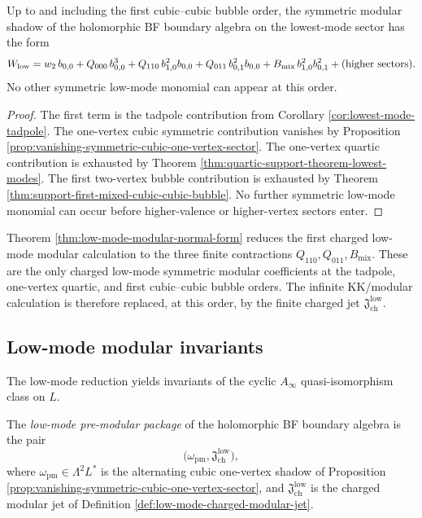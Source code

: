 \begin{theorem}
\label{thm:low-mode-modular-normal-form}
Up to and including the first cubic--cubic bubble order, the symmetric modular shadow of the
holomorphic BF boundary algebra on the lowest-mode sector has the form
\begin{equation}
\label{eq:low-mode-modular-normal-form}
W_{\mathrm{low}}
=
w_2\,b_{0,0}
+
Q_{000}\,b_{0,0}^3
+
Q_{110}\,b_{1,0}^2b_{0,0}
+
Q_{011}\,b_{0,1}^2b_{0,0}
+
B_{\mathrm{mix}}\,b_{1,0}^2b_{0,1}^2
+
\textup{(higher sectors)}.
\end{equation}
No other symmetric low-mode monomial can appear at this order.
\end{theorem}

\begin{proof}
The first term is the tadpole contribution from Corollary
\ref{cor:lowest-mode-tadpole}. The one-vertex cubic symmetric contribution vanishes by
Proposition \ref{prop:vanishing-symmetric-cubic-one-vertex-sector}. The one-vertex quartic
contribution is exhausted by Theorem \ref{thm:quartic-support-theorem-lowest-modes}. The
first two-vertex bubble contribution is exhausted by Theorem
\ref{thm:support-first-mixed-cubic-cubic-bubble}. No further symmetric low-mode monomial can
occur before higher-valence or higher-vertex sectors enter.
\end{proof}

\begin{remark}
\label{rem:what-has-been-proved}
Theorem \ref{thm:low-mode-modular-normal-form} reduces the first charged low-mode modular
calculation to the three finite contractions
$Q_{110},Q_{011},B_{\mathrm{mix}}$. These are the only charged low-mode symmetric modular
coefficients at the tadpole, one-vertex quartic, and first cubic--cubic bubble orders. The
infinite KK/modular calculation is therefore replaced, at this order, by the finite charged jet
\(\mathfrak J_{\mathrm{ch}}^{\mathrm{low}}\).
\end{remark}

\subsection{Low-mode modular invariants}
\label{subsec:low-mode-modular-invariants}

The low-mode reduction yields invariants of the cyclic $A_\infty$ quasi-isomorphism class on $L$.

\begin{definition}
\label{def:low-mode-pre-modular-package}
The \emph{low-mode pre-modular package} of the holomorphic BF boundary algebra is the pair
\[
\bigl(\omega_{\mathrm{pm}},\mathfrak J_{\mathrm{ch}}^{\mathrm{low}}\bigr),
\]
where $\omega_{\mathrm{pm}}\in \Lambda^2L^*$ is the alternating cubic one-vertex shadow of
Proposition \ref{prop:vanishing-symmetric-cubic-one-vertex-sector}, and
$\mathfrak J_{\mathrm{ch}}^{\mathrm{low}}$ is the charged modular jet of Definition
\ref{def:low-mode-charged-modular-jet}.
\end{definition}

